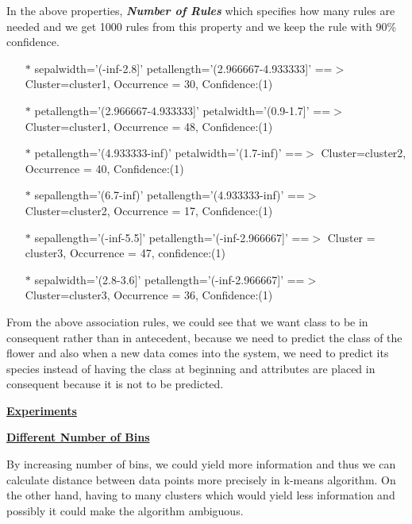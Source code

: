 \documentclass[a4paper,10pt]{article}
\begin{document}
In the above properties, \textbf{\textit{Number of Rules}} which specifies how many rules are needed and we get
1000 rules from this property and we keep the rule with 90\% confidence.
\begin{enumerate}     
  \item [$*$] sepalwidth='(-inf-2.8]' petallength='(2.966667-4.933333]' ==$>$ Cluster=cluster1, Occurrence = 30, Confidence:(1)
  \item [$*$] petallength='(2.966667-4.933333]' petalwidth='(0.9-1.7]' ==$>$ Cluster=cluster1, Occurrence = 48, Confidence:(1)
  \item [$*$] petallength='(4.933333-inf)' petalwidth='(1.7-inf)' ==$>$ Cluster=cluster2, Occurrence = 40, Confidence:(1)
  \item [$*$] sepallength='(6.7-inf)' petallength='(4.933333-inf)' ==$>$ Cluster=cluster2, Occurrence = 17, Confidence:(1)
  \item [$*$] sepallength='(-inf-5.5]' petallength='(-inf-2.966667]' ==$>$ Cluster = cluster3, Occurrence = 47, confidence:(1)
  \item [$*$] sepalwidth='(2.8-3.6]' petallength='(-inf-2.966667]' ==$>$ Cluster=cluster3, Occurrence = 36, Confidence:(1)
\end{enumerate}
\par
From the above association rules, we could see that we want class to be in consequent rather than in antecedent, because
we need to predict the class of the flower and also when a new data comes into the system, we need to predict its species
instead of having the class at beginning and attributes are placed in consequent because it is not to be predicted. \par
\textbf{\underline{Experiments}} \par
\textbf{\underline{Different Number of Bins}} \par
By increasing number of bins, we could yield more information and thus we can calculate distance between data points 
more precisely in k-means algorithm. On the other hand, having to many clusters which would yield less information and
possibly it could make the algorithm ambiguous. 
\end{document}
